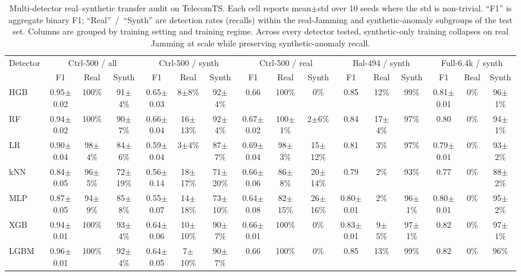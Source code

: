 \begin{table}[t]
  \caption{Multi-detector real--synthetic transfer audit on TelecomTS. Each cell reports mean$\pm$std over 10 seeds where the std is non-trivial. ``F1'' is aggregate binary F1; ``Real''~/~``Synth'' are detection rates (recalls) within the real-Jamming and synthetic-anomaly subgroups of the test set. Columns are grouped by training setting and training regime. Across every detector tested, synthetic-only training collapses on real Jamming at scale while preserving synthetic-anomaly recall.}
  \label{tab:e9_transfer}
  \scriptsize
  \setlength{\tabcolsep}{2.6pt}
  \begin{tabular}{@{}lccccccccccccccc@{}}
    \toprule
    Detector & \multicolumn{3}{c}{Ctrl-500 / all} & \multicolumn{3}{c}{Ctrl-500 / synth} & \multicolumn{3}{c}{Ctrl-500 / real} & \multicolumn{3}{c}{Bal-494 / synth} & \multicolumn{3}{c}{Full-6.4k / synth} \\
    \cmidrule(lr){2-4}\cmidrule(lr){5-7}\cmidrule(lr){8-10}\cmidrule(lr){11-13}\cmidrule(lr){14-16}
      & F1 & Real & Synth & F1 & Real & Synth & F1 & Real & Synth & F1 & Real & Synth & F1 & Real & Synth \\
    \midrule
    HGB & 0.95$\pm$0.02 & 100\% & 91$\pm$4\% & 0.65$\pm$0.03 & 8$\pm$8\% & 92$\pm$4\% & 0.66 & 100\% & 0\% & 0.85 & 12\% & 99\% & 0.81$\pm$0.01 & 0\% & 96$\pm$1\% \\
    RF & 0.94$\pm$0.02 & 100\% & 90$\pm$7\% & 0.66$\pm$0.04 & 16$\pm$13\% & 92$\pm$4\% & 0.67$\pm$0.02 & 100$\pm$1\% & 2$\pm$6\% & 0.84 & 17$\pm$4\% & 97\% & 0.80 & 0\% & 94$\pm$1\% \\
    LR & 0.90$\pm$0.04 & 98$\pm$4\% & 84$\pm$6\% & 0.59$\pm$0.04 & 3$\pm$4\% & 87$\pm$7\% & 0.69$\pm$0.04 & 98$\pm$3\% & 15$\pm$12\% & 0.81 & 3\% & 97\% & 0.79$\pm$0.01 & 0\% & 93$\pm$2\% \\
    kNN & 0.84$\pm$0.05 & 96$\pm$5\% & 72$\pm$19\% & 0.56$\pm$0.14 & 18$\pm$17\% & 71$\pm$20\% & 0.66$\pm$0.06 & 86$\pm$8\% & 20$\pm$14\% & 0.79 & 2\% & 93\% & 0.77 & 0\% & 88$\pm$2\% \\
    MLP & 0.87$\pm$0.05 & 94$\pm$9\% & 85$\pm$8\% & 0.55$\pm$0.07 & 14$\pm$18\% & 73$\pm$10\% & 0.64$\pm$0.08 & 82$\pm$15\% & 26$\pm$16\% & 0.80$\pm$0.01 & 2\% & 96$\pm$1\% & 0.80$\pm$0.01 & 0\% & 95$\pm$2\% \\
    XGB & 0.94$\pm$0.01 & 100\% & 93$\pm$4\% & 0.64$\pm$0.06 & 10$\pm$10\% & 90$\pm$7\% & 0.66$\pm$0.01 & 100\% & 0\% & 0.83$\pm$0.01 & 9$\pm$5\% & 97$\pm$1\% & 0.82 & 0\% & 97$\pm$1\% \\
    LGBM & 0.96$\pm$0.01 & 100\% & 92$\pm$4\% & 0.64$\pm$0.05 & 7$\pm$10\% & 90$\pm$7\% & 0.66 & 100\% & 0\% & 0.85 & 13\% & 99\% & 0.82 & 0\% & 96\% \\
    \bottomrule
  \end{tabular}
\end{table}
